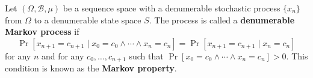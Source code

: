 Let $(\Omega, \mathcal{B}, \mu)$ be a sequence space with a denumerable stochastic process $\{x_n\}$ from $\Omega$ to a denumerable state space $S$. The process is called a \textbf{denumerable Markov process} if
$$\Pr[x_{n+1} = c_{n+1} \mid x_0 = c_0 \wedge \cdots \wedge x_n = c_n] = \Pr[x_{n+1} = c_{n+1} \mid x_n = c_n]$$
for any $n$ and for any $c_0, \ldots, c_{n+1}$ such that $\Pr[x_0 = c_0 \wedge \cdots \wedge x_n = c_n] > 0$. This condition is known as the \textbf{Markov property}.